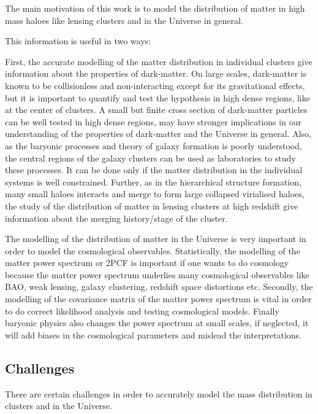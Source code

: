 The main motivation of this work is to model the distribution of matter in high mass
haloes like lensing clusters and in the Universe in general. 

This information is useful in two ways: 

First, the accurate modelling of the matter distribution in individual clusters
give information about the properties of dark-matter. On large scales, dark-matter
is known to be collisionless and non-interacting except for its gravitational effects,
but it is important to quantify and test the hypothesis in high dense regions, like
at the center of clusters. A small but finite cross section of dark-matter particles
can be well tested in high dense regions, may have stronger implications in our 
understanding of the properties of dark-matter and the Universe in general.  
Also, as the baryonic processes and theory of galaxy
formation is poorly understood, the central regions of the galaxy clusters can be 
used as laboratories to study these processes. It can be done only if the matter 
distribution in the individual systems is well constrained. 
Further, as in the hierarchical structure formation, many small haloes interacts and
merge to form large collapsed virialised haloes, the study of the distribution of 
matter in lensing clusters at high redshift give information about the merging
history/stage of the cluster. 

The modelling of the distribution of matter in the Universe is very important
in order to model the cosmological observables. Statistically, the modelling of the
matter power spectrum or 2PCF is important if one wants to do cosmology because 
the matter power spectrum underlies many
cosmological observables like BAO, weak lensing, galaxy clustering, redshift
space distortions etc. Secondly, the modelling of the 
covariance matrix of the matter power spectrum is vital in order to do correct
likelihood analysis and testing cosmological models. Finally baryonic physics 
also changes the power spectrum at small scales, if neglected, it will add biases
in the cosmological parameters and mislead the interpretations. 

\subsection{Challenges}

There are certain challenges in order to accurately model the mass distribution
in clusters and in the Universe. 

